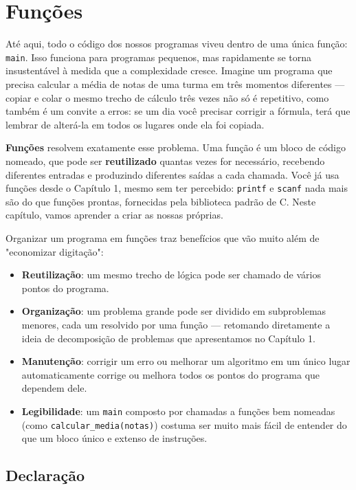 \chapter{Funções}

Até aqui, todo o código dos nossos programas viveu dentro de uma única função: \texttt{main}. Isso funciona para programas pequenos, mas rapidamente se torna insustentável à medida que a complexidade cresce. Imagine um programa que precisa calcular a média de notas de uma turma em três momentos diferentes — copiar e colar o mesmo trecho de cálculo três vezes não só é repetitivo, como também é um convite a erros: se um dia você precisar corrigir a fórmula, terá que lembrar de alterá-la em todos os lugares onde ela foi copiada.

\textbf{Funções} resolvem exatamente esse problema. Uma função é um bloco de código nomeado, que pode ser \textbf{reutilizado} quantas vezes for necessário, recebendo diferentes entradas e produzindo diferentes saídas a cada chamada. Você já usa funções desde o Capítulo 1, mesmo sem ter percebido: \texttt{printf} e \texttt{scanf} nada mais são do que funções prontas, fornecidas pela biblioteca padrão de C. Neste capítulo, vamos aprender a criar as nossas próprias.

Organizar um programa em funções traz benefícios que vão muito além de "economizar digitação":

\begin{itemize}
    \item \textbf{Reutilização}: um mesmo trecho de lógica pode ser chamado de vários pontos do programa.
    \item \textbf{Organização}: um problema grande pode ser dividido em subproblemas menores, cada um resolvido por uma função — retomando diretamente a ideia de decomposição de problemas que apresentamos no Capítulo 1.
    \item \textbf{Manutenção}: corrigir um erro ou melhorar um algoritmo em um único lugar automaticamente corrige ou melhora todos os pontos do programa que dependem dele.
    \item \textbf{Legibilidade}: um \texttt{main} composto por chamadas a funções bem nomeadas (como \texttt{calcular\_media(notas)}) costuma ser muito mais fácil de entender do que um bloco único e extenso de instruções.
\end{itemize}

\section{Declaração}

